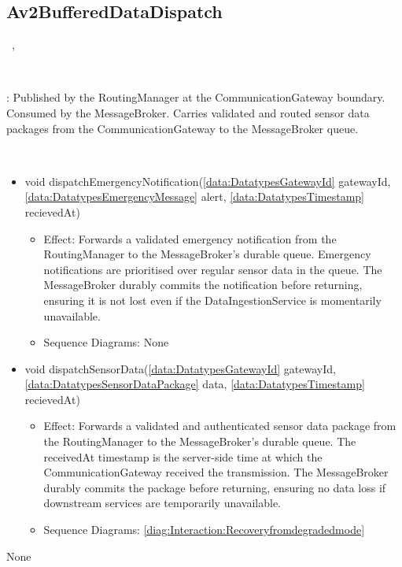  \subsection{Av2BufferedDataDispatch}\label{int:InterfacesAv2BufferedDataDispatch}
    \begin{description}
      \item[Provided by:] \iconcomponent{}~, \iconcomponent{}~
      \item[Required by:] \iconcomponent{}~ 
           \item[Description]: Published by the RoutingManager at the CommunicationGateway boundary. Consumed by the MessageBroker. Carries validated and routed sensor data packages from the CommunicationGateway to the MessageBroker queue.
      \item[Operations:] ~
    \begin{itemize}[noitemsep,nolistsep,leftmargin=-.25cm]
      \item \textsf{void dispatchEmergencyNotification(\ref{data:DatatypesGatewayId} gatewayId, \ref{data:DatatypesEmergencyMessage} alert, \ref{data:DatatypesTimestamp} recievedAt)}
        \begin{itemize}[noitemsep,nolistsep]
           \item Effect: Forwards a validated emergency notification from the RoutingManager to the MessageBroker's durable queue. Emergency notifications are prioritised over regular sensor data in the queue. The MessageBroker durably commits the notification before returning, ensuring it is not lost even if the DataIngestionService is momentarily unavailable. 
           \item Sequence Diagrams: None
        \end{itemize}
      \item \textsf{void dispatchSensorData(\ref{data:DatatypesGatewayId} gatewayId, \ref{data:DatatypesSensorDataPackage} data, \ref{data:DatatypesTimestamp} recievedAt)}
        \begin{itemize}[noitemsep,nolistsep]
           \item Effect: Forwards a validated and authenticated sensor data package from the RoutingManager to the MessageBroker's durable queue. The receivedAt timestamp is the server-side time at which the CommunicationGateway received the transmission. The MessageBroker durably commits the package before returning, ensuring no data loss if downstream services are temporarily unavailable. 
           \item Sequence Diagrams: \cref{diag:Interaction:Recoveryfromdegradedmode}
        \end{itemize}
    \end{itemize}
      \item[Diagrams:] None
    \end{description}

